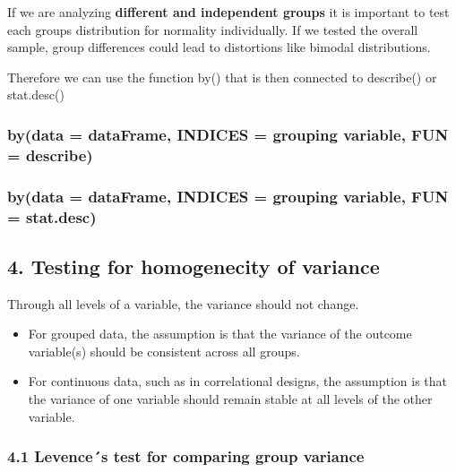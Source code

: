 \documentclass[
]{article}
\begin{document}
If we are analyzing \textbf{different and independent groups} it is
important to test each groups distribution for normality individually.
If we tested the overall sample, group differences could lead to
distortions like bimodal distributions.

Therefore we can use the function by() that is then connected to
describe() or stat.desc()

\hypertarget{bydata-dataframe-indices-grouping-variable-fun-describe}{%
\subsubsection{by(data = dataFrame, INDICES = grouping variable, FUN =
describe)}\label{bydata-dataframe-indices-grouping-variable-fun-describe}}

\hypertarget{bydata-dataframe-indices-grouping-variable-fun-stat.desc}{%
\subsubsection{by(data = dataFrame, INDICES = grouping variable, FUN =
stat.desc)}\label{bydata-dataframe-indices-grouping-variable-fun-stat.desc}}

\hypertarget{testing-for-homogenecity-of-variance}{%
\subsection{4. Testing for homogenecity of
variance}\label{testing-for-homogenecity-of-variance}}

Through all levels of a variable, the variance should not change.

\begin{itemize}
\item
  For grouped data, the assumption is that the variance of the outcome
  variable(s) should be consistent across all groups.
\item
  For continuous data, such as in correlational designs, the assumption
  is that the variance of one variable should remain stable at all
  levels of the other variable.
\end{itemize}

\hypertarget{levences-test-for-comparing-group-variance}{%
\subsubsection{4.1 Levence´s test for comparing group
variance}\label{levences-test-for-comparing-group-variance}}
\end{document}
